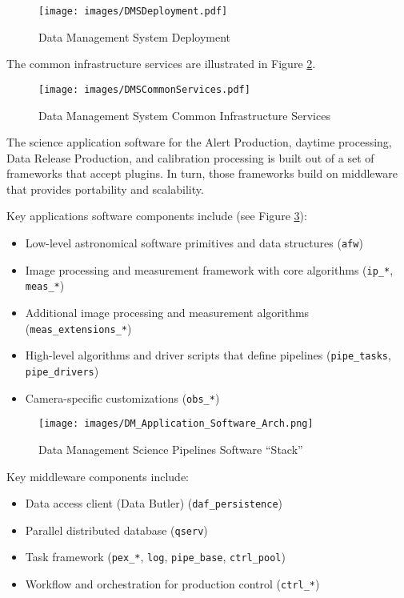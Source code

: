 \documentclass[DM,lsstdraft,toc]{lsstdoc}
\begin{document}
\begin{figure}
\centering
\texttt{[image: images/DMSDeployment.pdf]}
\caption{Data Management System Deployment}
\label{fig:deployment}
\end{figure}

The common infrastructure services are illustrated in Figure \ref{fig:commonservices}.

\begin{figure}
\centering
\texttt{[image: images/DMSCommonServices.pdf]}
\caption{Data Management System Common Infrastructure Services}
\label{fig:commonservices}
\end{figure}

The science application software for the Alert Production, daytime
processing, Data Release Production, and calibration processing is built
out of a set of frameworks that accept plugins. In turn, those
frameworks build on middleware that provides portability and
scalability.

Key applications software components include (see Figure \ref{fig:scipi}):
\begin{itemize}
\item
  Low-level astronomical software primitives and data structures
  (\texttt{afw})
\item
  Image processing and measurement framework with core algorithms
  (\texttt{ip\_*}, \texttt{meas\_*})
\item
  Additional image processing and measurement algorithms
  (\texttt{meas\_extensions\_*})
\item
  High-level algorithms and driver scripts that define pipelines
  (\texttt{pipe\_tasks}, \texttt{pipe\_drivers})
\item
  Camera-specific customizations (\texttt{obs\_*})
\end{itemize}

\begin{figure}
\centering
\texttt{[image: images/DM\_Application\_Software\_Arch.png]}
\caption{Data Management Science Pipelines Software ``Stack''}
\label{fig:scipi}
\end{figure}

Key middleware components include:
\begin{itemize}
\item
  Data access client (Data Butler) (\texttt{daf\_persistence})
\item
  Parallel distributed database (\texttt{qserv})
\item
  Task framework (\texttt{pex\_*}, \texttt{log}, \texttt{pipe\_base},
  \texttt{ctrl\_pool})
\item
  Workflow and orchestration for production control (\texttt{ctrl\_*})
\end{itemize}
\end{document}

